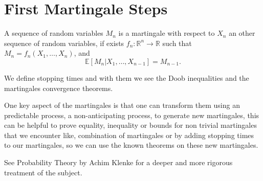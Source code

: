 \section{First Martingale Steps}

A sequence of random variables ${M_n}$ is a martingale with respect to ${X_n}$ an other sequence of random variables,
if exists $f_n: \mathbb{R}^n \rightarrow \mathbb{R}$ such that $M_n = f_n(X_1, \dots, X_n)$, and
\begin{equation*}
    \mathbb{E}[M_n | X_1, \dots, X_{n - 1}] = M_{n - 1}.
\end{equation*}

We define stopping times and with them we see the Doob inequalities and the martingales convergence theorems.

One key aspect of the martingales is that one can transform them using an predictable process, a non-anticipating process,
to generate new martingales, this can be helpful to prove equality,
inequality or bounds for non trivial martingales that we encounter like,
combination of martingales or by adding stopping times to our martingales, so we can use the known theorems on these new martingales.

See Probability Theory by Achim Klenke for a deeper and more rigorous treatment of the subject.
